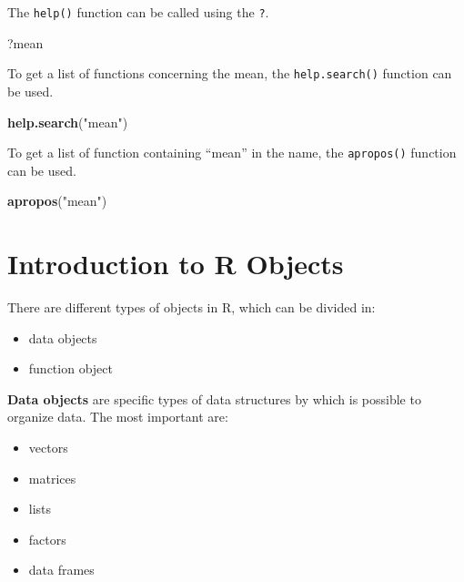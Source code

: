 \documentclass[]{book}
\newenvironment{Shaded}{\begin{snugshade}}{\end{snugshade}}
\newcommand{\KeywordTok}[1]{\textcolor[rgb]{0.13,0.29,0.53}{\textbf{{#1}}}}
\newcommand{\StringTok}[1]{\textcolor[rgb]{0.31,0.60,0.02}{{#1}}}
\newcommand{\NormalTok}[1]{{#1}}
\providecommand{\tightlist}{%
  \setlength{\itemsep}{0pt}\setlength{\parskip}{0pt}}
\def\tightlist{}
\begin{document}
The \texttt{help()} function can be called using the \texttt{?}.

\begin{Shaded}
\begin{Highlighting}[]
\NormalTok{?mean}
\end{Highlighting}
\end{Shaded}

To get a list of functions concerning the mean, the
\texttt{help.search()} function can be used.

\begin{Shaded}
\begin{Highlighting}[]
\KeywordTok{help.search}\NormalTok{(}\StringTok{"mean"}\NormalTok{)}
\end{Highlighting}
\end{Shaded}

To get a list of function containing ``mean'' in the name, the
\texttt{apropos()} function can be used.

\begin{Shaded}
\begin{Highlighting}[]
\KeywordTok{apropos}\NormalTok{(}\StringTok{"mean"}\NormalTok{)}
\end{Highlighting}
\end{Shaded}

\chapter{Introduction to R Objects}\label{introduction-to-r-objects}

There are different types of objects in R, which can be divided in:

\begin{itemize}
\tightlist
\item
  data objects
\item
  function object
\end{itemize}

\textbf{Data objects} are specific types of data structures by which is
possible to organize data. The most important are:

\begin{itemize}
\tightlist
\item
  vectors
\item
  matrices
\item
  lists
\item
  factors
\item
  data frames
\end{itemize}
\end{document}
